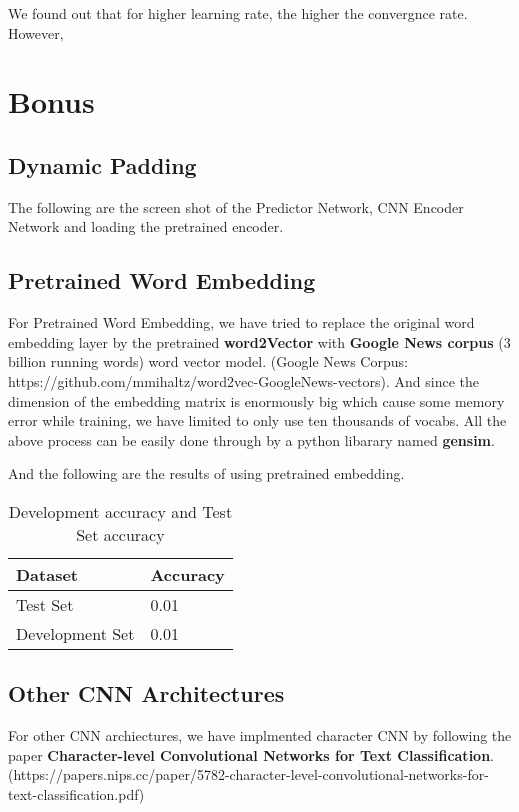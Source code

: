 \documentclass{article}
\begin{document}
We found out that for higher learning rate, the higher the convergnce rate. However, 
\section{Bonus}

\subsection{Dynamic Padding}
The following are the screen shot of the Predictor Network, CNN Encoder Network and loading the pretrained encoder.

\subsection{Pretrained Word Embedding}
For Pretrained Word Embedding, we have tried to replace the original word embedding layer by the pretrained \textbf{word2Vector} with \textbf{Google News corpus} (3 billion running words) word vector model. (Google News Corpus: https://github.com/mmihaltz/word2vec-GoogleNews-vectors). And since the dimension of the embedding matrix is enormously big which cause some memory error while training, we have limited to only use ten thousands of vocabs. All the above process can be easily done through by a python libarary named \textbf{gensim}.

And the following are the results of using pretrained embedding.

\begin{table}[htb]
	\caption{Development accuracy and Test Set accuracy}
	\label{sample-table}
	\centering
	\begin{tabular}{ll}
		\toprule
		\cmidrule{1-2}
		Dataset &Accuracy\\
		\midrule
		Test Set & 0.01   \\
		Development Set & 0.01  \\
		\bottomrule
	\end{tabular}
\end{table}

\subsection{Other CNN Architectures}
For other CNN archiectures, we have implmented character CNN by following the paper \textbf{Character-level Convolutional Networks for Text Classification}. (https://papers.nips.cc/paper/5782-character-level-convolutional-networks-for-text-classification.pdf) 
\end{document}
